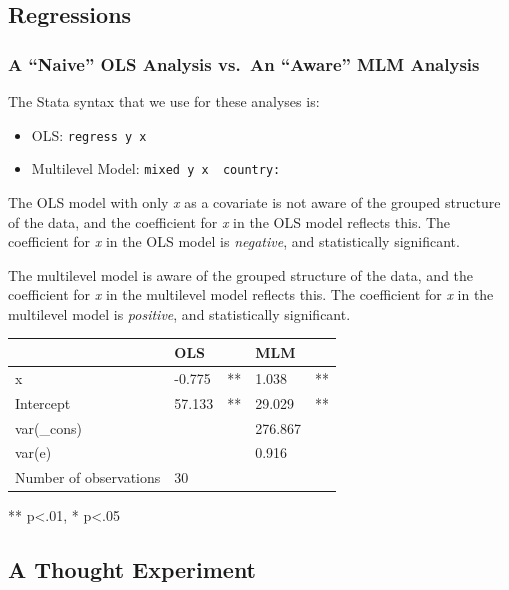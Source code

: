 \documentclass[
  letterpaper,
  DIV=11,
  numbers=noendperiod]{scrreprt}
\providecommand{\tightlist}{%
  \setlength{\itemsep}{0pt}\setlength{\parskip}{0pt}}\usepackage{longtable,booktabs,array}
\begin{document}
\hypertarget{regressions}{%
\subsection{Regressions}\label{regressions}}

\hypertarget{a-naive-ols-analysis-vs.-an-aware-mlm-analysis}{%
\subsubsection{A ``Naive'' OLS Analysis vs.~An ``Aware'' MLM
Analysis}\label{a-naive-ols-analysis-vs.-an-aware-mlm-analysis}}

The Stata syntax that we use for these analyses is:

\begin{itemize}
\tightlist
\item
  OLS: \texttt{regress\ y\ x}
\item
  Multilevel Model: \texttt{mixed\ y\ x\ \textbar{}\textbar{}\ country:}
\end{itemize}

The OLS model with only \emph{x} as a covariate is not aware of the
grouped structure of the data, and the coefficient for \emph{x} in the
OLS model reflects this. The coefficient for \emph{x} in the OLS model
is \emph{negative}, and statistically significant.

The multilevel model is aware of the grouped structure of the data, and
the coefficient for \emph{x} in the multilevel model reflects this. The
coefficient for \emph{x} in the multilevel model is \emph{positive}, and
statistically significant.

\begin{longtable}[]{@{}lllll@{}}
\toprule()
& OLS & & MLM & \\
\midrule()
\endhead
x & -0.775 & ** & 1.038 & ** \\
Intercept & 57.133 & ** & 29.029 & ** \\
var(\_cons) & & & 276.867 & \\
var(e) & & & 0.916 & \\
Number of observations & 30 & & & \\
\bottomrule()
\end{longtable}

** p\textless.01, * p\textless.05

\hypertarget{a-thought-experiment}{%
\subsection{A Thought Experiment}\label{a-thought-experiment}}
\end{document}
